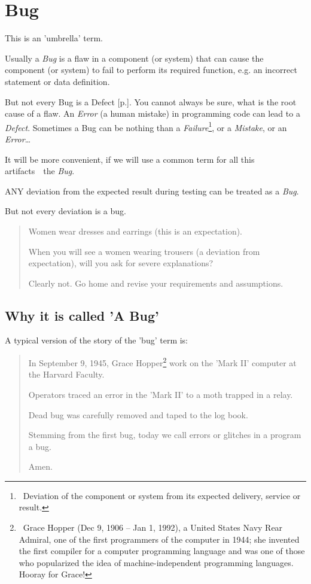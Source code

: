\section{Bug}
\label{sec:Bug}

This is an 'umbrella' term.

Usually a \emph{Bug} is a flaw in a component (or system) that can cause the component (or system) to fail to perform its required function, e.g. an incorrect statement or data definition.

But not every Bug is a Defect [p.\pageref{sec:Defect}]. You cannot always be sure, what is the root cause of a flaw. An \emph{Error} (a human mistake) in programming code can lead to a \emph{Defect}. Sometimes a Bug can be nothing than a \emph{Failure}\footnote{~Deviation of the component or system from its expected delivery, service or result.}, or a \emph{Mistake}, or an \emph{Error}\ldots 

It will be more convenient, if we will use a common term for all this artifacts~\textemdash~the \emph{Bug}.

ANY deviation from the expected result during testing can be treated as a \emph{Bug}. 

But not every deviation is a bug.

\begin{quote}
Women wear dresses and earrings (this is an expectation). 

When you will see a women wearing trousers (a deviation from expectation), will you ask for severe explanations?

Clearly not. Go home and revise your requirements and assumptions.
\end{quote} 

\subsection{Why it is called 'A Bug'}

A typical version of the story of the 'bug' term is:

\begin{quote}
In September 9, 1945, Grace Hopper\footnote{~Grace Hopper (Dec 9, 1906 – Jan 1, 1992), a United States Navy Rear Admiral, one of the first programmers of the  computer in 1944; she invented the first compiler for a computer programming language and was one of those who popularized the idea of machine-independent programming languages. Hooray for Grace!} work on the 'Mark II' computer at the Harvard Faculty.

Operators traced an error in the 'Mark II' to a moth trapped in a relay. 

Dead bug was carefully removed and taped to the log book. 

Stemming from the first bug, today we call errors or glitches in a program a bug.

Amen.
\end{quote} 

